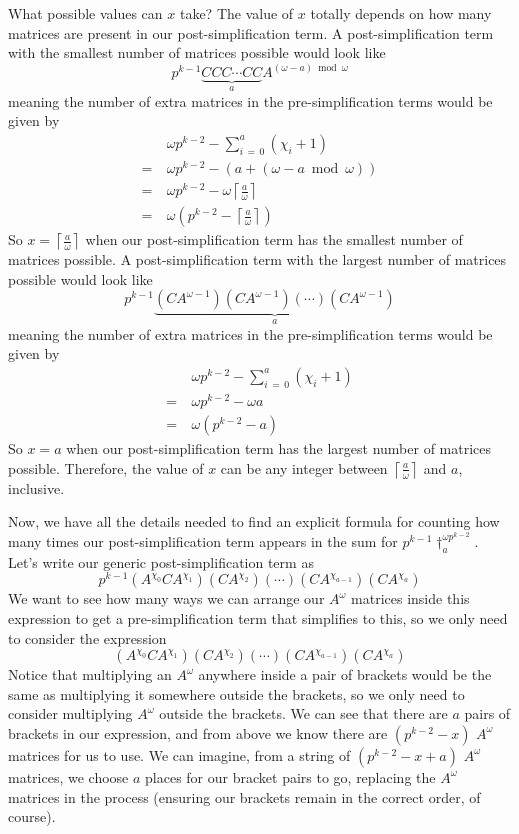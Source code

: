 \documentclass[a4paper, 12pt, reqno]{amsart}
\newcommand\ceil[1]{\left\lceil #1 \right\rceil}
\begin{document}
		What possible values can $x$ take? The value of $x$ totally depends on how many matrices are present in our post-simplification term. A post-simplification term with
		the smallest number of matrices possible would look like
		\[
			p^{k-1}\underbrace{CCC\cdots CC}_{a}A^{(\omega - a) \bmod{\omega}}
		\]
		meaning the number of extra matrices in the pre-simplification terms would be given by
		\begin{align*}
			 & \ \omega p^{k-2} - \sum_{i\,=\,0}^a (\chi_i + 1)    \\
			=& \ \omega p^{k-2} - (a + (\omega - a \bmod{\omega})) \\
			=& \ \omega p^{k-2} - \omega\ceil{\frac{a}{\omega}}    \\
			=& \ \omega\left(p^{k-2} - \ceil{\frac{a}{\omega}}\right)
		\end{align*}
		So $x = \ceil{\frac{a}{\omega}}$ when our post-simplification term has the smallest number of matrices possible. A post-simplification term with the largest number of
		matrices possible would look like
		\[
			p^{k-1}\underbrace{(CA^{\omega-1})(CA^{\omega-1})(\cdots)(CA^{\omega-1})}_a
		\]
		meaning the number of extra matrices in the pre-simplification terms would be given by
		\begin{align*}
			 & \ \omega p^{k-2} - \sum_{i\,=\,0}^a (\chi_i + 1) \\
			=& \ \omega p^{k-2} - \omega a                      \\
			=& \ \omega(p^{k-2} - a)
		\end{align*}
		So $x = a$ when our post-simplification term has the largest number of matrices possible. Therefore, the value of $x$ can be any integer between 
		$\ceil{\frac{a}{\omega}}$ and $a$, inclusive.
		
		Now, we have all the details needed to find an explicit formula for counting how many times our post-simplification term appears in the sum for 
		$p^{k-1}\dag_a^{\omega p^{k-2}}$. Let's write our generic post-simplification term as
		\[
			p^{k-1}(A^{\chi_0}CA^{\chi_1})(CA^{\chi_2})(\cdots)(CA^{\chi_{a-1}})(CA^{\chi_a})
		\]
		We want to see how many ways we can arrange our $A^\omega$ matrices inside this expression to get a pre-simplification term that simplifies to this, so we only need
		to consider the expression
		\[
			(A^{\chi_0}CA^{\chi_1})(CA^{\chi_2})(\cdots)(CA^{\chi_{a-1}})(CA^{\chi_a})
		\]
		Notice that multiplying an $A^\omega$ anywhere inside a pair of brackets would be the same as multiplying it somewhere outside the brackets, so we only need to 
		consider multiplying $A^\omega$ outside the brackets. We can see that there are $a$ pairs of brackets in our expression, and from above we know there are
		$(p^{k-2} - x)$ $A^\omega$ matrices for us to use. We can imagine, from a string of $(p^{k-2} - x + a)$ $A^\omega$ matrices, we choose $a$ places for our bracket 
		pairs to go, replacing the $A^\omega$ matrices in the process (ensuring our brackets remain in the correct order, of course).
		
\end{document}
